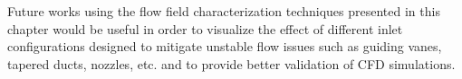 Future works using the flow field characterization techniques presented in this chapter would be useful in order to visualize the effect of different inlet configurations designed to mitigate unstable flow issues such as guiding vanes, tapered ducts, nozzles, etc. and to provide better validation of CFD simulations.
